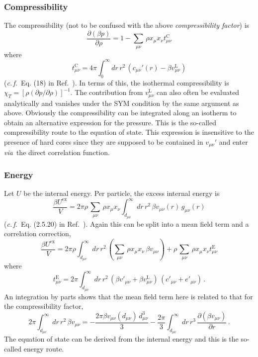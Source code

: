 \documentclass[12pt,a4paper]{article}
\newcommand{\latin}[1]{\emph{#1}}
\newcommand{\cf}{\latin{c.\,f.}}
\newcommand{\via}{\latin{via}}
\newcommand{\myex}{^{\mathrm{ex}}}
\newcommand{\Uex}{U\myex}
\newcommand{\lr}{^{\mathrm{L}}}
\newcommand{\Refcite}[1]{Ref.~\cite{#1}}
\begin{document}
\subsubsection{Compressibility}
%
The compressibility (not to be confused with the above
\emph{compressibility factor}) is
%
\begin{equation}
\frac{\partial(\beta p)}{\partial\rho}=
1-{\textstyle \sum_{\mu\nu}}\,\rho x_\mu x_\nu t^{\mathrm{C}}_{\mu\nu}
\end{equation}
%
where
%
\begin{equation}
t^{\mathrm{C}}_{\mu\nu}={4\pi}\int_0^\infty\!\!dr\,r^2\,(c_{\mu\nu}'(r)
-\beta v_{\mu\nu}\lr)
\end{equation}
%
(\cf\ Eq. (18) in \Refcite{Vrbka09}).  In terms of this, the
isothermal compressibility is $\chi_T=[\rho(\partial
  p/\partial\rho)]^{-1}$.  The contribution from $v_{\mu\nu}\lr$ can
also often be evaluated analytically and vanishes under the SYM
condition by the same argument as above.  Obviously the
compressibility can be integrated along an isotherm to obtain an
alternative expression for the pressure.  This is the so-called
compressibility route to the equation of state.  This expression is
insensitive to the presence of hard cores since they are supposed to
be contained in $v_{\mu\nu}'$ and enter \via\ the direct correlation
function.

\subsubsection{Energy}
%
Let $U$ be the internal energy.  Per particle, the excess internal
energy is
%
\begin{equation}
\frac{\beta \Uex}{V}=2\pi\rho\,{\textstyle \sum_{\mu\nu}}\,\rho x_\mu x_\nu 
\int_{d_{\mu\nu}}^\infty\!\!dr\, r^2\, \beta v_{\mu\nu}(r)\,g_{\mu\nu}(r)
\end{equation}
%
(\cf\ Eq. (2.5.20) in \Refcite{HM06}).  Again this can be split into
a mean field term and a correlation correction,
%
\begin{equation}
\frac{\beta\Uex}{V}={2\pi\rho}\int_{d_{\mu\nu}}^\infty\!\!dr\,r^2\,
({\textstyle \sum_{\mu\nu}}\,\rho x_\mu x_\nu\,\beta
  v_{\mu\nu})
+\rho\,{\textstyle \sum_{\mu\nu}}\,
\rho x_\mu x_\nu t^{\mathrm{E}}_{\mu\nu}
\end{equation}
%
where 
%
\begin{equation}
t^{\mathrm{E}}_{\mu\nu}={2\pi}\int_{d_{\mu\nu}}^\infty\!\!dr\,r^2\,
(\beta v'_{\mu\nu}+\beta v_{\mu\nu}\lr)\,(c'_{\mu\nu}+e'_{\mu\nu})\,.
\end{equation}
%
An integration by parts shows that the mean field term here is related
to that for the compressibility factor,
%
\begin{equation}
{2\pi}\int_{d_{\mu\nu}}^\infty\!\!dr\,r^2\,
\beta v_{\mu\nu}
=
-\frac{2\pi\beta v_{\mu\nu}(d_{\mu\nu})\,d_{\mu\nu}^3}{3}
-\frac{2\pi}{3}\int_{d_{\mu\nu}}^\infty\!\!dr\,r^3\,
\frac{\partial(\beta
  v_{\mu\nu})}{\partial r}\,.\label{eq:same}
\end{equation}
%
The equation of state can be derived from the internal energy and this
is the so-called energy route.
\end{document}
